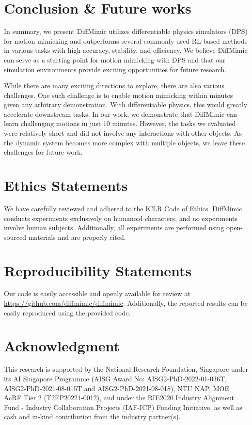 \section{Conclusion \& Future works}

In summary,  we present DiffMimic utilizes differentiable physics simulators (DPS) for motion mimicking and outperforms several commonly used RL-based methods in various tasks with high accuracy, stability, and efficiency. We believe DiffMimic can serve as a starting point for motion mimicking with DPS and that our simulation environments provide exciting opportunities for future research.

While there are many exciting directions to explore, there are also various challenges. One such challenge is to enable motion mimicking within minutes given any arbitrary demonstration. With differentiable physics, this would greatly accelerate downstream tasks. In our work, we demonstrate that DiffMimic can learn challenging motions in just 10 minutes. However, the tasks we evaluated were relatively short and did not involve any interactions with other objects. As the dynamic system becomes more complex with multiple objects, we leave these challenges for future work.



\clearpage
\section*{Ethics Statements}
We have carefully reviewed and adhered to the ICLR Code of Ethics. DiffMimic conducts experiments exclusively on humanoid characters, and no experiments involve human subjects. Additionally, all experiments are performed using open-sourced materials and are properly cited.

\section*{Reproducibility Statements}
Our code is easily accessible and openly available for review at \hyperlink{https://github.com/diffmimic/diffmimic}{https://github.com/diffmimic/diffmimic}. Additionally, the reported results can be easily reproduced using the provided code.

\section*{Acknowledgment}
This research is supported by the National Research Foundation, Singapore under its AI Singapore Programme (AISG Award No: AISG2-PhD-2022-01-036T,  AISG2-PhD-2021-08-015T and AISG2-PhD-2021-08-018), NTU NAP, MOE AcRF Tier 2 (T2EP20221-0012), and under the RIE2020 Industry Alignment Fund - Industry Collaboration Projects
(IAF-ICP) Funding Initiative, as well as cash and in-kind contribution from the industry partner(s).